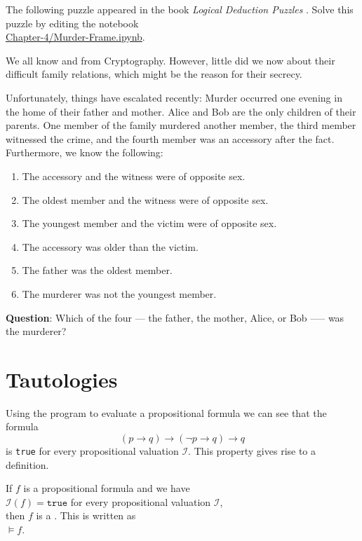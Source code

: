 \exerciseEng
The following puzzle appeared in the book \emph{Logical Deduction Puzzles} \cite{summers:2006}.
Solve this puzzle by editing the notebook
\\[0.2cm]
\hspace*{1.3cm}
\href{https://github.com/karlstroetmann/Logic/blob/master/TypeScript/Chapter-4/Murder-Frame.ipynb}{Chapter-4/Murder-Frame.ipynb}.

\begin{center}
\begin{minipage}{0.95\linewidth}
We all know  and  from Cryptography.  However, little did
we now about their difficult family relations, which might be the reason for
their secrecy.  

Unfortunately, things have escalated recently:
Murder occurred one evening in the home of their father and mother.  Alice and Bob are the only children of
their parents. One member of the family murdered another member, the third member witnessed the crime, and the
fourth member was an accessory after the fact.  Furthermore, we know the following: 
\begin{enumerate}
\item The accessory and the witness were of opposite sex.
\item The oldest member and the witness were of opposite sex.
\item The youngest member and the victim were of opposite sex.
\item The accessory was older than the victim.
\item The father was the oldest member.
\item The murderer was not the youngest member.
\end{enumerate}
\textbf{Question}: Which of the four --- the father, the mother, Alice, or Bob --— was the murderer?
\eox
\end{minipage} 
\end{center}

\section{Tautologies}
Using the program to evaluate a propositional formula we can see that the formula
$$  (p \rightarrow q) \rightarrow (\neg p \rightarrow q) \rightarrow q $$
is \texttt{true} for every propositional valuation $\mathcal{I}$.  This property gives rise to a definition.

\begin{Definition}[Tautology]
  If $f$ is a propositional formula and we have
  \\[0.2cm]
  \hspace*{1.3cm}
  $\mathcal{I}(f) = \texttt{true}$ \quad for every propositional valuation $\mathcal{I}$, \\[0.2cm]
  then $f$ is a  .  This is written as \\[0.2cm]
  \hspace*{1.3cm} $\models f$.
  \eox
\end{Definition}

